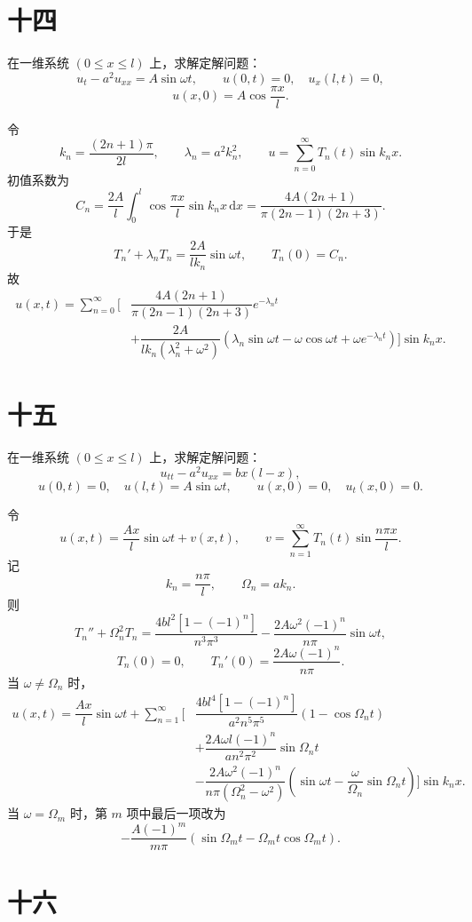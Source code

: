 \documentclass[UTF8,zihao=-4]{ctexart}
\begin{document}
\section*{十四}

在一维系统 $(0\le x\le l)$ 上，求解定解问题：
\[
u_t-a^2u_{xx}=A\sin\omega t,\qquad
u(0,t)=0,\quad u_x(l,t)=0,
\]
\[
u(x,0)=A\cos\dfrac{\pi x}{l}.
\]

令
\[
k_n=\dfrac{(2n+1)\pi}{2l},\qquad
\lambda_n=a^2k_n^2,\qquad
u=\sum_{n=0}^{\infty}T_n(t)\sin k_nx.
\]
初值系数为
\[
C_n=\dfrac{2A}{l}\int_0^l\cos\dfrac{\pi x}{l}\sin k_nx\,\mathrm{d}x
=\dfrac{4A(2n+1)}{\pi(2n-1)(2n+3)}.
\]
于是
\[
T_n'+\lambda_nT_n=\dfrac{2A}{lk_n}\sin\omega t,\qquad T_n(0)=C_n.
\]
故
\[
\begin{aligned}
u(x,t)=\sum_{n=0}^{\infty}\Bigg[
&\dfrac{4A(2n+1)}{\pi(2n-1)(2n+3)}e^{-\lambda_nt}\\
&+\dfrac{2A}{lk_n(\lambda_n^2+\omega^2)}
\left(\lambda_n\sin\omega t-\omega\cos\omega t+\omega e^{-\lambda_nt}\right)
\Bigg]\sin k_nx.
\end{aligned}
\]

\section*{十五}

在一维系统 $(0\le x\le l)$ 上，求解定解问题：
\[
u_{tt}-a^2u_{xx}=bx(l-x),
\]
\[
u(0,t)=0,\quad u(l,t)=A\sin\omega t,\qquad
u(x,0)=0,\quad u_t(x,0)=0.
\]

令
\[
u(x,t)=\dfrac{Ax}{l}\sin\omega t+v(x,t),
\qquad
v=\sum_{n=1}^{\infty}T_n(t)\sin\dfrac{n\pi x}{l}.
\]
记
\[
k_n=\dfrac{n\pi}{l},\qquad \Omega_n=ak_n.
\]
则
\[
T_n''+\Omega_n^2T_n=
\dfrac{4bl^2[1-(-1)^n]}{n^3\pi^3}
-\dfrac{2A\omega^2(-1)^n}{n\pi}\sin\omega t,
\]
\[
T_n(0)=0,\qquad
T_n'(0)=\dfrac{2A\omega(-1)^n}{n\pi}.
\]
当 $\omega\ne\Omega_n$ 时，
\[
\begin{aligned}
u(x,t)=\dfrac{Ax}{l}\sin\omega t+\sum_{n=1}^{\infty}\Bigg[
&\dfrac{4bl^4[1-(-1)^n]}{a^2n^5\pi^5}(1-\cos\Omega_nt)\\
&+\dfrac{2A\omega l(-1)^n}{an^2\pi^2}\sin\Omega_nt\\
&-\dfrac{2A\omega^2(-1)^n}{n\pi(\Omega_n^2-\omega^2)}
\left(\sin\omega t-\dfrac{\omega}{\Omega_n}\sin\Omega_nt\right)
\Bigg]\sin k_nx.
\end{aligned}
\]
当 $\omega=\Omega_m$ 时，第 $m$ 项中最后一项改为
\[
-\dfrac{A(-1)^m}{m\pi}
\left(\sin\Omega_mt-\Omega_mt\cos\Omega_mt\right).
\]

\section*{十六}
\end{document}
